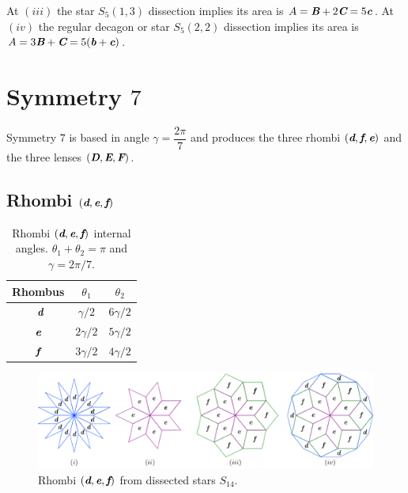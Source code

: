 \documentclass[11pt]{article}
\def\mathbi#1{\textbf{\em #1}}
\begin{document}
At $(iii)$ the star $S_5(1,3)$ dissection implies its area is $A = \mathbi{B} + 2\mathbi{C} = 5\mathbi{c}$.
At $(iv)$ the regular decagon or star $S_5(2,2)$ dissection implies its area is $A = 3\mathbi{B} + \mathbi{C} = 5(\mathbi{b} + \mathbi{c})$.



\section{Symmetry $7$}

Symmetry $7$ is based in angle $\gamma = \dfrac{2\pi}7$ and produces the three rhombi $(\mathbi{d},\mathbi{f},\mathbi{e})$ and the three lenses $(\mathbi{D},\mathbi{E},\mathbi{F})$.

\subsection{Rhombi $(\mathbi{d},\mathbi{e},\mathbi{f})$}

\begin{table}[H]
\begin{center}
\begin{tabular}{|c|c c|} \hline
Rhombus & $\theta_1$ & $\theta_2$ \\ \hline\
$\mathbi{d}$ & $\gamma/2$ & $6\gamma/2$ \\[0.5ex] \hline
$\mathbi{e}$ & $2\gamma/2$ & $5\gamma/2$ \\[0.5ex] \hline
$\mathbi{f}$ & $3\gamma/2$ & $4\gamma/2$ \\[0.5ex] \hline
\end{tabular}
\caption{Rhombi $(\mathbi{d},\mathbi{e},\mathbi{f})$ internal angles. $\theta_1 + \theta_2 = \pi$ and $\gamma = 2\pi/7$.} 
\label{tbl:def-angles}
\end{center}
\end{table}

\begin{figure}[H]
\centering
\includegraphics[scale=1]{def/rhombi}
\caption{Rhombi $(\mathbi{d},\mathbi{e},\mathbi{f})$ from dissected stars $S_{14}$. }
\label{fig:def-rhombi}
\end{figure}
\end{document}
